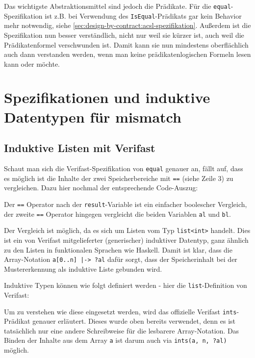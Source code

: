 Das wichtigste Abstraktionsmittel sind jedoch die Prädikate. Für die \lstinline{equal}-Spezifikation ist 
z.B. bei Verwendung des \lstinline{IsEqual}-Prädikats gar kein Behavior mehr notwendig,
siehe \ref{sec:design-by-contract:acsl-spezifikation}. Außerdem ist die Spezifikation nun besser verständlich,
nicht nur weil sie kürzer ist, auch weil die Prädikatenformel verschwunden ist. Damit kann sie nun mindestens
oberflächlich auch dann verstanden werden, wenn man keine prädikatenlogischen Formeln lesen kann oder möchte.



\section{Spezifikationen und induktive Datentypen für mismatch}
\label{sec:induktive-datentypen}
\subsection{Induktive Listen mit Verifast}

Schaut man sich die Verifast-Spezifikation von \lstinline{equal} genauer an, fällt auf, dass es 
möglich ist die Inhalte der zwei Speicherbereiche mit \lstinline{==} (siehe Zeile 3) zu vergleichen. 
Dazu hier nochmal der entsprechende Code-Auszug:



Der \lstinline{==} Operator nach der \lstinline{result}-Variable ist ein einfacher boolescher Vergleich,
der zweite \lstinline{==} Operator hingegen vergleicht die beiden Variablen \lstinline{al} und \lstinline{bl}.

Der Vergleich ist möglich, da es sich um Listen vom Typ \lstinline{list<int>} handelt. Dies ist ein
von Verifast mitgelieferter (generischer) induktiver Datentyp, ganz ähnlich zu den Listen in funktionalen 
Sprachen wie Haskell. Damit ist klar, dass die Array-Notation \lstinline{a[0..n] |-> ?al} dafür sorgt, 
dass der Speicherinhalt bei der Mustererkennung als induktive Liste gebunden wird.

Induktive Typen können wie folgt definiert werden - hier die \lstinline{list}-Definition von Verifast:



Um zu verstehen wie diese eingesetzt werden, wird das offizielle Verifast \lstinline{ints}-Prädikat genauer
erläutert. Dieses wurde oben bereits verwendet, denn es ist tatsächlich nur eine andere Schreibweise für die 
lesbarere Array-Notation. Das Binden der Inhalte aus dem Array \lstinline{a} ist darum auch via 
\lstinline{ints(a, n, ?al)} möglich.

